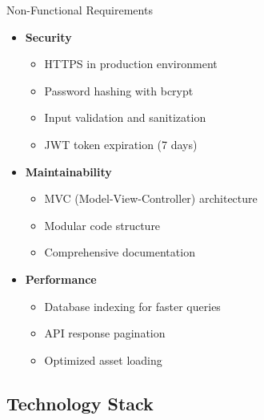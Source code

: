 \begin{frame}{Non-Functional Requirements}
\begin{itemize}
    \item \textbf{Security}
    \begin{itemize}
        \item HTTPS in production environment
        \item Password hashing with bcrypt
        \item Input validation and sanitization
        \item JWT token expiration (7 days)
    \end{itemize}
    
    \item \textbf{Maintainability}
    \begin{itemize}
        \item MVC (Model-View-Controller) architecture
        \item Modular code structure
        \item Comprehensive documentation
    \end{itemize}
    
    \item \textbf{Performance}
    \begin{itemize}
        \item Database indexing for faster queries
        \item API response pagination
        \item Optimized asset loading
    \end{itemize}
\end{itemize}
\end{frame}

\subsection{Technology Stack}

